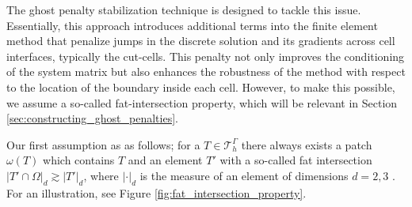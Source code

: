 \documentclass[11pt]{article}
\theoremstyle{remark}
\newcommand{\abs}[1]{\left\lvert #1 \right\rvert}
\numberwithin{equation}{section}
\begin{document}
The ghost penalty stabilization technique is designed to tackle this issue. Essentially, this approach introduces additional terms into the finite element method that penalize jumps in the discrete solution and its gradients across cell interfaces,
typically the cut-cells. This penalty not only improves the conditioning of the system matrix but also enhances the robustness of the method with respect to the location of the boundary inside each cell. However, to make this possible, we assume a
so-called fat-intersection property, which will be relevant in Section \ref{sec:constructing_ghost_penalties}.

Our first assumption as as follows;
for a $T \in \mathcal{T} ^{\Gamma }_{h}$ there always exists a patch $\omega ( T) $ which contains $T$ and an element $T'$ with a so-called fat intersection $
        \abs{ T' \cap \Omega  } _{d} \gtrsim \abs{ T' } _{d}$, where $\abs{ \cdot  }_{d} $ is the measure of an element of dimensions $d =2,3  $ . For an illustration, see Figure \ref{fig:fat_intersection_property}.
\end{document}
